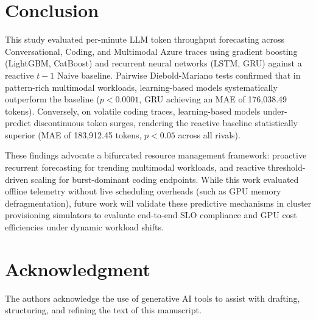 \documentclass[conference, a4paper]{IEEEtran}
\begin{document}
\section{Conclusion}
This study evaluated per-minute LLM token throughput forecasting across Conversational, Coding, and Multimodal Azure traces using gradient boosting (LightGBM, CatBoost) and recurrent neural networks (LSTM, GRU) against a reactive $t-1$ Naive baseline. Pairwise Diebold-Mariano tests confirmed that in pattern-rich multimodal workloads, learning-based models systematically outperform the baseline ($p < 0.0001$, GRU achieving an MAE of 176,038.49 tokens). Conversely, on volatile coding traces, learning-based models under-predict discontinuous token surges, rendering the reactive baseline statistically superior (MAE of 183,912.45 tokens, $p < 0.05$ across all rivals).

These findings advocate a bifurcated resource management framework: proactive recurrent forecasting for trending multimodal workloads, and reactive threshold-driven scaling for burst-dominant coding endpoints. While this work evaluated offline telemetry without live scheduling overheads (such as GPU memory defragmentation), future work will validate these predictive mechanisms in cluster provisioning simulators to evaluate end-to-end SLO compliance and GPU cost efficiencies under dynamic workload shifts.

\section*{Acknowledgment}
The authors acknowledge the use of generative AI tools to assist with drafting, structuring, and refining the text of this manuscript.



{\footnotesize
}
\end{document}
